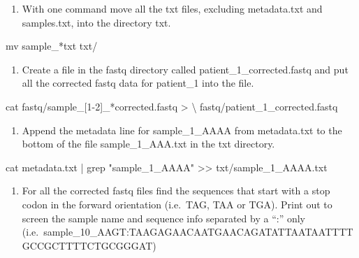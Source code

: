 \documentclass[
  letterpaper,
  DIV=11,
  numbers=noendperiod]{scrreprt}
\newenvironment{Shaded}{\begin{snugshade}}{\end{snugshade}}
\newcommand{\DataTypeTok}[1]{\textcolor[rgb]{0.68,0.00,0.00}{#1}}
\newcommand{\FunctionTok}[1]{\textcolor[rgb]{0.28,0.35,0.67}{#1}}
\newcommand{\KeywordTok}[1]{\textcolor[rgb]{0.00,0.23,0.31}{#1}}
\newcommand{\NormalTok}[1]{\textcolor[rgb]{0.00,0.23,0.31}{#1}}
\newcommand{\OperatorTok}[1]{\textcolor[rgb]{0.37,0.37,0.37}{#1}}
\newcommand{\PreprocessorTok}[1]{\textcolor[rgb]{0.68,0.00,0.00}{#1}}
\newcommand{\SpecialStringTok}[1]{\textcolor[rgb]{0.13,0.47,0.30}{#1}}
\newcommand{\StringTok}[1]{\textcolor[rgb]{0.13,0.47,0.30}{#1}}
\providecommand{\tightlist}{%
  \setlength{\itemsep}{0pt}\setlength{\parskip}{0pt}}\usepackage{longtable,booktabs,array}
\begin{document}
\begin{enumerate}
\def\labelenumi{\arabic{enumi}.}
\setcounter{enumi}{4}
\tightlist
\item
  With one command move all the txt files, excluding metadata.txt and
  samples.txt, into the directory txt.
\end{enumerate}

\begin{Shaded}
\begin{Highlighting}[]
\FunctionTok{mv}\NormalTok{ sample\_}\PreprocessorTok{*}\NormalTok{txt txt/}
\end{Highlighting}
\end{Shaded}

\begin{enumerate}
\def\labelenumi{\arabic{enumi}.}
\setcounter{enumi}{5}
\tightlist
\item
  Create a file in the fastq directory called
  patient\_1\_corrected.fastq and put all the corrected fastq data for
  patient\_1 into the file.
\end{enumerate}

\begin{Shaded}
\begin{Highlighting}[]
\FunctionTok{cat}\NormalTok{ fastq/sample\_}\PreprocessorTok{[}\SpecialStringTok{1}\PreprocessorTok{{-}}\SpecialStringTok{2}\PreprocessorTok{]}\NormalTok{\_}\PreprocessorTok{*}\NormalTok{corrected.fastq }\OperatorTok{\textgreater{}} \DataTypeTok{\textbackslash{}}
\NormalTok{fastq/patient\_1\_corrected.fastq}
\end{Highlighting}
\end{Shaded}

\begin{enumerate}
\def\labelenumi{\arabic{enumi}.}
\setcounter{enumi}{6}
\tightlist
\item
  Append the metadata line for sample\_1\_AAAA from metadata.txt to the
  bottom of the file sample\_1\_AAA.txt in the txt directory.
\end{enumerate}

\begin{Shaded}
\begin{Highlighting}[]
\FunctionTok{cat}\NormalTok{ metadata.txt }\KeywordTok{|} \FunctionTok{grep} \StringTok{"sample\_1\_AAAA"} \OperatorTok{\textgreater{}\textgreater{}}\NormalTok{ txt/sample\_1\_AAAA.txt}
\end{Highlighting}
\end{Shaded}

\begin{enumerate}
\def\labelenumi{\arabic{enumi}.}
\setcounter{enumi}{7}
\tightlist
\item
  For all the corrected fastq files find the sequences that start with a
  stop codon in the forward orientation (i.e.~TAG, TAA or TGA). Print
  out to screen the sample name and sequence info separated by a ``:''
  only
  (i.e.~sample\_10\_AAGT:TAAGAGAACAATGAACAGATATTAATAATTTTGCCGCTTTTCTGCGGGAT)
\end{enumerate}
\end{document}

